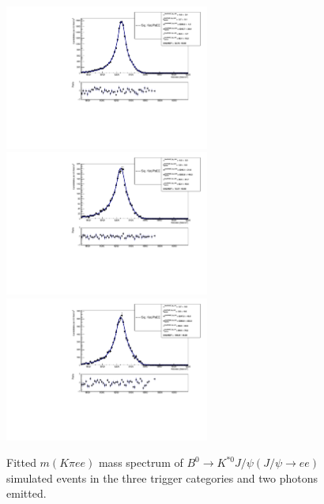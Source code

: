 \begin{figure}[h!]
\centering
\includegraphics[width=0.6\textwidth]{RKst/figs/fit_EEs_0_EE-q2central-gmc/KstJPsEE_2g_L0E_fitAndRes.pdf}
\includegraphics[width=0.6\textwidth]{RKst/figs/fit_EEs_0_EE-q2central-gmc/KstJPsEE_2g_L0H_fitAndRes.pdf}
\includegraphics[width=0.6\textwidth]{RKst/figs/fit_EEs_0_EE-q2central-gmc/KstJPsEE_2g_L0I_fitAndRes.pdf}
\caption{Fitted $m(K\pi ee)$ mass spectrum of $B^0 \rightarrow K^{*0} J/\psi(J/\psi\rightarrow ee)$ simulated
events in the three trigger categories and two photons emitted. }
\label{fig:FitEE_MC_inTrigCat_Brem2}
\end{figure}
